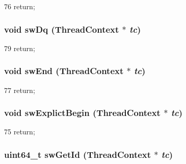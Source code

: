 \begin{DoxyCode}
76 { return; }
\end{DoxyCode}
\hypertarget{classCPA_a759a46e423c6c00777c90f1cac3fcef7}{
\subsubsection[{swDq}]{\setlength{\rightskip}{0pt plus 5cm}void swDq ({\bf ThreadContext} $\ast$ {\em tc})}}
\label{classCPA_a759a46e423c6c00777c90f1cac3fcef7}



\begin{DoxyCode}
79 { return; }
\end{DoxyCode}
\hypertarget{classCPA_a5473221a1c243bdd4d84c21ec1270f9e}{
\subsubsection[{swEnd}]{\setlength{\rightskip}{0pt plus 5cm}void swEnd ({\bf ThreadContext} $\ast$ {\em tc})}}
\label{classCPA_a5473221a1c243bdd4d84c21ec1270f9e}



\begin{DoxyCode}
77 { return; }
\end{DoxyCode}
\hypertarget{classCPA_aa45d330146020f18a5fc68f435bc1154}{
\subsubsection[{swExplictBegin}]{\setlength{\rightskip}{0pt plus 5cm}void swExplictBegin ({\bf ThreadContext} $\ast$ {\em tc})}}
\label{classCPA_aa45d330146020f18a5fc68f435bc1154}



\begin{DoxyCode}
75 { return; }
\end{DoxyCode}
\hypertarget{classCPA_a22857436177616b92bb58196ae977955}{
\subsubsection[{swGetId}]{\setlength{\rightskip}{0pt plus 5cm}uint64\_\-t swGetId ({\bf ThreadContext} $\ast$ {\em tc})}}
\label{classCPA_a22857436177616b92bb58196ae977955}



